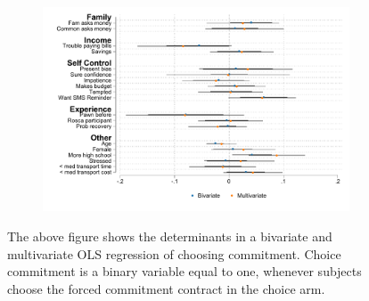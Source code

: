 \begin{figure}[H]
    \caption{Determinants of choice}
    \label{determinants_choose}
    \begin{center}
    \begin{subfigure}{0.75\textwidth}
        \centering
        \includegraphics[width=\textwidth]{Figuras/determinants_choose_commitment.pdf}
    \end{subfigure}
    \end{center}
      \scriptsize

      The above figure shows the determinants in a bivariate and multivariate OLS regression of choosing commitment. Choice commitment is a binary variable equal to one, whenever subjects choose the forced commitment contract in the choice arm. 
\end{figure}



